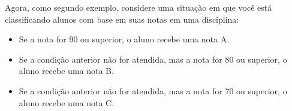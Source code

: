 \documentclass[letterpaper,10pt,english]{jupyterBook}
\begin{document}
\sphinxAtStartPar
Agora, como segundo exemplo, considere uma situação em que você está classificando alunos com base em suas notas em uma disciplina:

\begin{sphinxVerbatim}[commandchars=\\\{\}]
  

   
   
   
\end{sphinxVerbatim}

\sphinxAtStartPar
{}
\begin{itemize}
\item {} 
\sphinxAtStartPar
Se a nota for 90 ou superior, o aluno recebe uma nota A.

\end{itemize}

\sphinxAtStartPar
{}
\begin{itemize}
\item {} 
\sphinxAtStartPar
Se a condição anterior não for atendida, mas a nota for 80 ou superior, o aluno recebe uma nota B.

\end{itemize}

\sphinxAtStartPar
{}
\begin{itemize}
\item {} 
\sphinxAtStartPar
Se a condição anterior não for atendida, mas a nota for 70 ou superior, o aluno recebe uma nota C.

\end{itemize}
\end{document}
